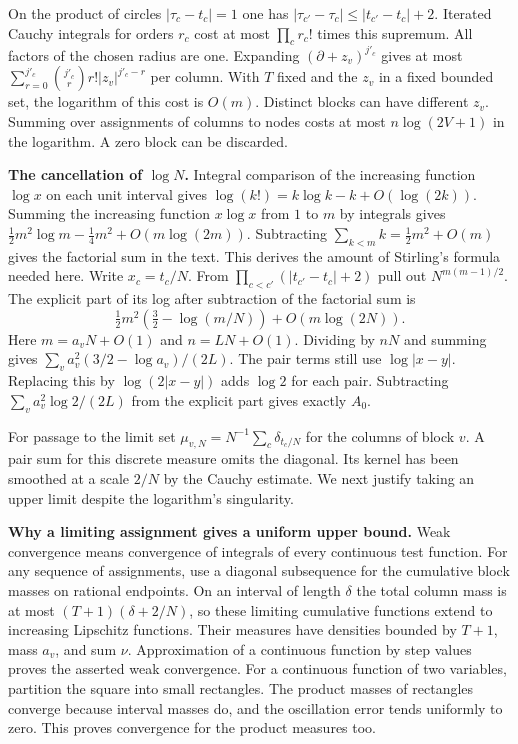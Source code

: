 \documentclass[11pt,a4paper]{article}
\begin{document}
On the product of circles \(|\tau_c-t_c|=1\) one has \(|\tau_{c'}-\tau_c|\le |t_{c'}-t_c|+2\). Iterated Cauchy integrals for orders \(r_c\) cost at most \(\prod_c r_c!\) times this supremum. All factors of the chosen radius are one. Expanding \((\partial+z_v)^{j'_c}\) gives at most \(\sum_{r=0}^{j'_c}\binom{j'_c}r r! |z_v|^{j'_c-r}\) per column. With \(T\) fixed and the \(z_v\) in a fixed bounded set, the logarithm of this cost is \(O(m)\). Distinct blocks can have different \(z_v\). Summing over assignments of columns to nodes costs at most \(n\log(2V+1)\) in the logarithm. A zero block can be discarded.

\textbf{The cancellation of \(\log N\).} Integral comparison of the increasing function \(\log x\) on each unit interval gives \(\log(k!)=k\log k-k+O(\log(2k))\). Summing the increasing function \(x\log x\) from \(1\) to \(m\) by integrals gives \(\frac12m^2\log m-\frac14m^2+O(m\log(2m))\). Subtracting \(\sum_{k<m}k=\frac12m^2+O(m)\) gives the factorial sum in the text. This derives the amount of Stirling's formula needed here. Write \(x_c=t_c/N\). From \(\prod_{c<c'}(|t_{c'}-t_c|+2)\) pull out \(N^{m(m-1)/2}\). The explicit part of its log after subtraction of the factorial sum is \[
 \tfrac12m^2(\tfrac32-\log(m/N))+O(m\log(2N)).
\] Here \(m=a_vN+O(1)\) and \(n=LN+O(1)\). Dividing by \(nN\) and summing gives \(\sum_v a_v^2(3/2-\log a_v)/(2L)\). The pair terms still use \(\log |x-y|\). Replacing this by \(\log(2|x-y|)\) adds \(\log 2\) for each pair. Subtracting \(\sum_v a_v^2\log2/(2L)\) from the explicit part gives exactly \(A_0\).

For passage to the limit set \(\mu_{v,N}=N^{-1}\sum_c\delta_{t_c/N}\) for the columns of block \(v\). A pair sum for this discrete measure omits the diagonal. Its kernel has been smoothed at a scale \(2/N\) by the Cauchy estimate. We next justify taking an upper limit despite the logarithm's singularity.

\textbf{Why a limiting assignment gives a uniform upper bound.} Weak convergence means convergence of integrals of every continuous test function. For any sequence of assignments, use a diagonal subsequence for the cumulative block masses on rational endpoints. On an interval of length \(\delta\) the total column mass is at most \((T+1)(\delta+2/N)\), so these limiting cumulative functions extend to increasing Lipschitz functions. Their measures have densities bounded by \(T+1\), mass \(a_v\), and sum \(\nu\). Approximation of a continuous function by step values proves the asserted weak convergence. For a continuous function of two variables, partition the square into small rectangles. The product masses of rectangles converge because interval masses do, and the oscillation error tends uniformly to zero. This proves convergence for the product measures too.
\end{document}
